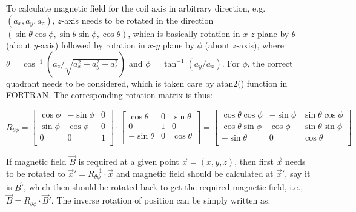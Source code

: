 \documentclass[12pt]{article}
\begin{document}
To calculate magnetic field for the coil axis in arbitrary direction, e.g. $\left(a_x,a_y,a_z\right)$, $z$-axis needs to be rotated in the direction $\left(\sin\theta\cos\phi,\sin\theta\sin\phi,\cos\theta\right)$, which is basically rotation in $x$-$z$ plane by $\theta$ (about $y$-axis) followed by rotation in $x$-$y$ plane by $\phi$ (about $z$-axis), where $\theta=\cos^{-1}\left(a_z/\sqrt{a_x^2+a_y^2+a_z^2}\right)$ and $\phi=\tan^{-1}\left(a_y/a_x\right)$. For $\phi$, the correct quadrant needs to be considered, which is taken care by atan2() function in FORTRAN. The corresponding rotation matrix is thus:

$$
R_{\theta\phi}=
\begin{bmatrix}
\cos\phi & -\sin\phi & 0 \\
\sin\phi & \cos\phi & 0 \\
0 & 0 & 1 \\
\end{bmatrix}
\cdot
\begin{bmatrix}
\cos\theta & 0 & \sin\theta \\
0 & 1 & 0 \\
-\sin\theta & 0 & \cos\theta \\
\end{bmatrix}
=
\begin{bmatrix}
\cos\theta\cos\phi & -\sin\phi & \sin\theta\cos\phi \\
\cos\theta\sin\phi & \cos\phi & \sin\theta\sin\phi \\
-\sin\theta & 0 & \cos\theta \\
\end{bmatrix}
$$

If magnetic field $\vec{B}$ is required at a given point $\vec{x}=\left(x,y,z\right)$, then first $\vec{x}$ needs to be rotated to $\vec{x}'=R_{\theta\phi}^{-1}\cdot\vec{x}$ and magnetic field should be calculated at $\vec{x}'$, say it is $\vec{B}'$, which then should be rotated back to get the required magnetic field, i.e., $\vec{B}=R_{\theta\phi}\cdot\vec{B}'$. The inverse rotation of position can be simply written as:
\end{document}

